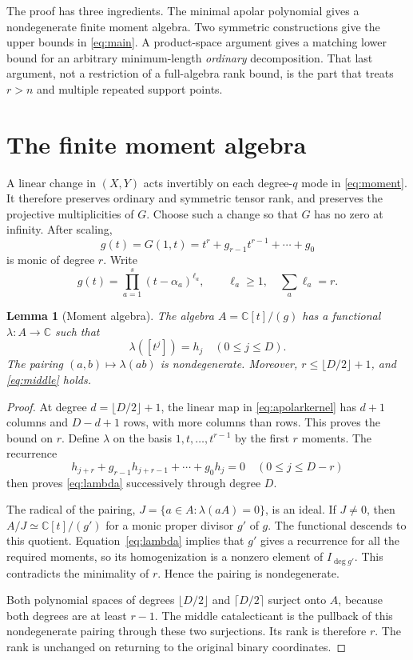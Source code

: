 \documentclass[11pt]{article}
\newtheorem{lemma}[theorem]{Lemma}
\theoremstyle{definition}
\theoremstyle{remark}
\newcommand{\C}{\mathbb C}
\begin{document}
The proof has three ingredients. The minimal apolar polynomial gives a
nondegenerate finite moment algebra. Two symmetric constructions give the
upper bounds in \eqref{eq:main}. A product-space argument gives a matching
lower bound for an arbitrary minimum-length \emph{ordinary} decomposition.
That last argument, not a restriction of a full-algebra rank bound, is the
part that treats $r>n$ and multiple repeated support points.

\section{The finite moment algebra}\label{sec:momentalgebra}

A linear change in $(X,Y)$ acts invertibly on each degree-$q$ mode in
\eqref{eq:moment}. It therefore preserves ordinary and symmetric tensor rank,
and preserves the projective multiplicities of $G$. Choose such a change so
that $G$ has no zero at infinity. After scaling,
\[
 g(t)=G(1,t)=t^r+g_{r-1}t^{r-1}+\cdots+g_0
\]
is monic of degree $r$.
Write
\begin{equation}\label{eq:gfact}
 g(t)=\prod_{a=1}^s(t-\alpha_a)^{\ell_a},\qquad
 \ell_a\ge1,\quad \sum_a\ell_a=r.
\end{equation}

\begin{lemma}[Moment algebra]\label{lem:moment}
The algebra $A=\C[t]/(g)$ has a functional $\lambda:A\to\C$ such that
\begin{equation}\label{eq:lambda}
 \lambda([t^j])=h_j\quad(0\le j\le D).
\end{equation}
The pairing $(a,b)\mapsto\lambda(ab)$ is nondegenerate. Moreover,
$r\le\lfloor D/2\rfloor+1$, and \eqref{eq:middle} holds.
\end{lemma}
\begin{proof}
At degree $d=\lfloor D/2\rfloor+1$, the linear map in
\eqref{eq:apolarkernel} has $d+1$ columns and $D-d+1$ rows, with more columns
than rows. This proves the bound on $r$.
Define $\lambda$ on the basis $1,t,\ldots,t^{r-1}$ by the first $r$ moments.
The recurrence
\[
 h_{j+r}+g_{r-1}h_{j+r-1}+\cdots+g_0h_j=0
 \quad(0\le j\le D-r)
\]
then proves \eqref{eq:lambda} successively through degree $D$.

The radical of the pairing,
$J=\{a\in A:\lambda(aA)=0\}$, is an ideal. If $J\ne0$, then
$A/J\simeq\C[t]/(g')$ for a monic proper divisor $g'$ of $g$.
The functional descends to this quotient. Equation~\eqref{eq:lambda} implies
that $g'$ gives a recurrence for all the required moments, so its
homogenization is a nonzero element of $I_{\deg g'}$.
This contradicts the minimality of $r$. Hence the pairing is nondegenerate.

Both polynomial spaces of degrees $\lfloor D/2\rfloor$ and
$\lceil D/2\rceil$ surject onto $A$, because both degrees are at least $r-1$.
The middle catalecticant is the pullback of this nondegenerate pairing through
these two surjections. Its rank is therefore $r$. The rank is unchanged on
returning to the original binary coordinates.
\end{proof}
\end{document}
